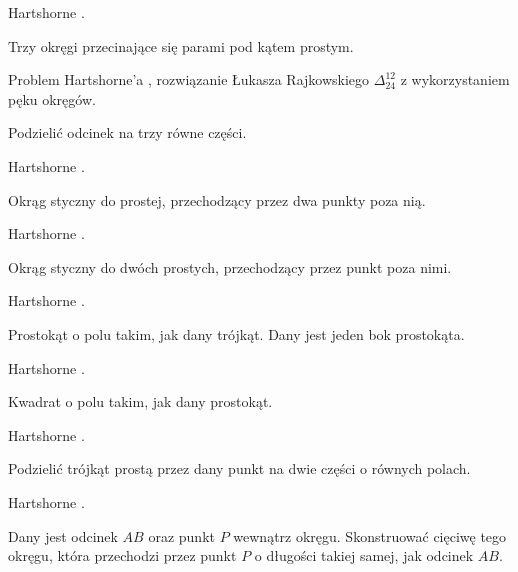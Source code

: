 Hartshorne \cite[s. 25]{hartshorne2000}.

\begin{problem}
    Trzy okręgi przecinające się parami pod kątem prostym.
\end{problem} %

Problem Hartshorne'a \cite[s. 25]{hartshorne2000}, rozwiązanie Łukasza Rajkowskiego $\Delta_{24}^{12}$ z wykorzystaniem pęku okręgów.

\begin{problem}
    Podzielić odcinek na trzy równe części.
\end{problem} %

Hartshorne \cite[s. 25]{hartshorne2000}.


\begin{problem}
    Okrąg styczny do prostej, przechodzący przez dwa punkty poza nią.
\end{problem}

Hartshorne \cite[s. 43]{hartshorne2000}.

\begin{problem}
    Okrąg styczny do dwóch prostych, przechodzący przez punkt poza nimi.
\end{problem}

Hartshorne \cite[s. 44]{hartshorne2000}.


\begin{problem}
    Prostokąt o polu takim, jak dany trójkąt.
    Dany jest jeden bok prostokąta.
\end{problem}
Hartshorne \cite[s. 43]{hartshorne2000}.

\begin{problem}
    Kwadrat o polu takim, jak dany prostokąt.
\end{problem}
Hartshorne \cite[s. 43]{hartshorne2000}.


\begin{problem}
    Podzielić trójkąt prostą przez dany punkt na dwie części o równych polach.
\end{problem}
Hartshorne \cite[s. 44]{hartshorne2000}.




\begin{problem}
    Dany jest odcinek $AB$ oraz punkt $P$ wewnątrz okręgu.
    Skonstruować cięciwę tego okręgu, która przechodzi przez punkt $P$ o długości takiej samej, jak odcinek $AB$.
\end{problem} %

